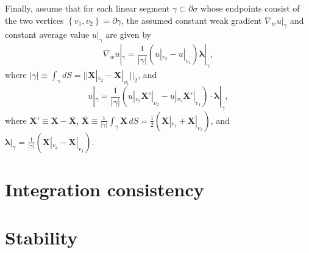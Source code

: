 \documentclass[10pt,a4paper]{article}
\begin{document}
Finally, assume that for each linear segment $\gamma \subset \partial \sigma$ whose endpoints consist of the two vertices $\left\{ v_1, v_2 \right\} = \partial \gamma$, the assumed constant weak gradient $\nabla_w u |_{\gamma}$ and constant average value $u |_{\gamma}$ are given by
\begin{equation}
  \nabla_{w} u |_{\gamma} = \frac{1}{|\gamma|} (u |_{v_2} - u |_{v_1}) \boldsymbol{\lambda} |_{\gamma},
\end{equation}
where $|\gamma| \equiv \int_{\gamma} dS = || \mathbf{X} |_{v_2} - \mathbf{X} |_{v_1} ||_2$, and
\begin{equation}
	u |_{\gamma} = \frac{1}{| \gamma |} (u |_{v_2} \mathbf{X}' |_{v_2} - u |_{v_1} \mathbf{X}' |_{v_1}) \cdot \boldsymbol{\lambda} |_{\gamma},
\end{equation}
where $\mathbf{X}' \equiv \mathbf{X} - \bar{\mathbf{X}}$, $\bar{\mathbf{X}} \equiv \frac{1}{|\gamma|} \int_{\gamma} \mathbf{X} \, dS = \frac{1}{2} (\mathbf{X} |_{v_1} + \mathbf{X} |_{v_2})$, and $\boldsymbol{\lambda} |_{\gamma} = \frac{1}{| \gamma |} (\mathbf{X} |_{v_2} - \mathbf{X} |_{v_1})$.

\section{Integration consistency}



\section{Stability}
\end{document}
